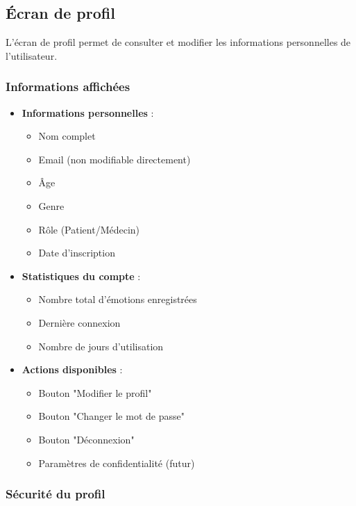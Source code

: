 \documentclass[a4paper,11pt]{report}
\begin{document}
\subsection{Écran de profil}

L'écran de profil permet de consulter et modifier les informations personnelles de l'utilisateur.

\subsubsection{Informations affichées}

\begin{itemize}
    \item \textbf{Informations personnelles} :
    \begin{itemize}
        \item Nom complet
        \item Email (non modifiable directement)
        \item Âge
        \item Genre
        \item Rôle (Patient/Médecin)
        \item Date d'inscription
    \end{itemize}
    
    \item \textbf{Statistiques du compte} :
    \begin{itemize}
        \item Nombre total d'émotions enregistrées
        \item Dernière connexion
        \item Nombre de jours d'utilisation
    \end{itemize}
    
    \item \textbf{Actions disponibles} :
    \begin{itemize}
        \item Bouton "Modifier le profil"
        \item Bouton "Changer le mot de passe"
        \item Bouton "Déconnexion"
        \item Paramètres de confidentialité (futur)
    \end{itemize}
\end{itemize}

\subsubsection{Sécurité du profil}
\end{document}
